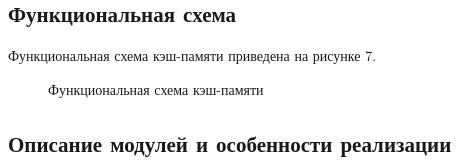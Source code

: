 \documentclass[13pt]{article}
\begin{document}
	\subsection{Функциональная схема}
	Функциональная схема кэш-памяти приведена на рисунке 7.
	\begin{figure}[h!]
		\caption{Функциональная схема кэш-памяти}
	\end{figure}
	\newpage
	\subsection{Описание модулей и особенности реализации}
\end{document}
